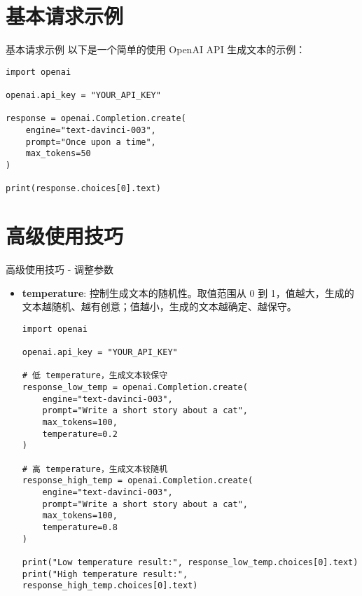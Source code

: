 \documentclass{beamer}
\begin{document}
\section{基本请求示例}
\begin{frame}{基本请求示例}
    以下是一个简单的使用 OpenAI API 生成文本的示例：
    \begin{lstlisting}[style=pythonstyle]
import openai

openai.api_key = "YOUR_API_KEY"

response = openai.Completion.create(
    engine="text-davinci-003",
    prompt="Once upon a time",
    max_tokens=50
)

print(response.choices[0].text)
    \end{lstlisting}
\end{frame}

\section{高级使用技巧}
\begin{frame}{高级使用技巧 - 调整参数}
    \begin{itemize}
        \item \textbf{temperature}: 控制生成文本的随机性。取值范围从 0 到 1，值越大，生成的文本越随机、越有创意；值越小，生成的文本越确定、越保守。
        \begin{lstlisting}[style=pythonstyle]
import openai

openai.api_key = "YOUR_API_KEY"

# 低 temperature，生成文本较保守
response_low_temp = openai.Completion.create(
    engine="text-davinci-003",
    prompt="Write a short story about a cat",
    max_tokens=100,
    temperature=0.2
)

# 高 temperature，生成文本较随机
response_high_temp = openai.Completion.create(
    engine="text-davinci-003",
    prompt="Write a short story about a cat",
    max_tokens=100,
    temperature=0.8
)

print("Low temperature result:", response_low_temp.choices[0].text)
print("High temperature result:", response_high_temp.choices[0].text)
        \end{lstlisting}
    \end{itemize}
\end{frame}
\end{document}
